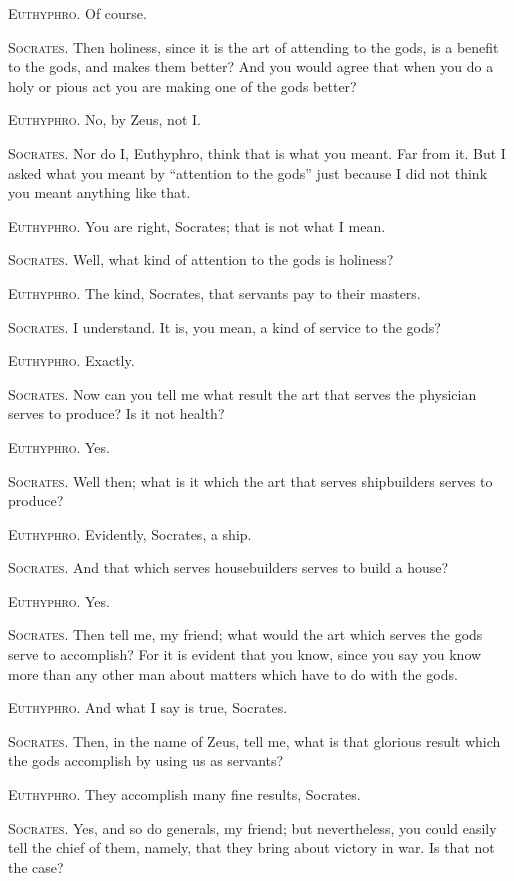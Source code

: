 \textsc{Euthyphro}. Of course.

\textsc{Socrates}. Then holiness, since it is the art of attending to
the gods, is a benefit to the gods, and  makes them better?
And you would agree that when you do a holy or pious act you are
making one of the gods better?

\textsc{Euthyphro}. No, by Zeus, not I.

\textsc{Socrates}. Nor do I, Euthyphro, think that is what you meant.
Far from it. But I asked what you meant by ``attention to the gods''
just because I did not think you meant anything like that.

\textsc{Euthyphro}. You are right, Socrates; that is not what I mean.

\textsc{Socrates}. Well, what kind of attention to the gods is
holiness?

\textsc{Euthyphro}. The kind, Socrates, that servants pay to their
masters.

\textsc{Socrates}. I understand. It is, you mean, a kind of service to
the gods?

\textsc{Euthyphro}. Exactly.

\textsc{Socrates}. Now can you tell me what result the art that serves
the physician serves to produce? Is it not health?

\textsc{Euthyphro}. Yes.

\textsc{Socrates}. Well then; what is it which the art that serves
shipbuilders serves to produce?

\textsc{Euthyphro}. Evidently, Socrates, a ship.

\textsc{Socrates}. And that which serves housebuilders serves to build
a house?

\textsc{Euthyphro}. Yes.

\textsc{Socrates}. Then tell me, my friend; what would the art which
serves the gods serve to accomplish? For it is evident that you know,
since you say you know more than any other man about matters which
have to do with the gods.

\textsc{Euthyphro}. And what I say is true, Socrates.

\textsc{Socrates}. Then, in the name of Zeus, tell me,  what
is that glorious result which the gods accomplish by using us as
servants?

\textsc{Euthyphro}. They accomplish many fine results, Socrates.

\textsc{Socrates}. Yes, and so do generals, my friend; but
nevertheless, you could easily tell the chief of them, namely, that
they bring about victory in war. Is that not the case?

